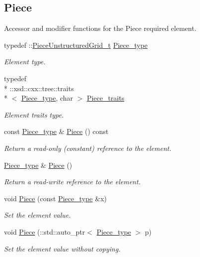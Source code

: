 \subsection*{Piece}
\label{_amgrpa5d512bf83495b68d0ffa20f79804dfc}%
Accessor and modifier functions for the Piece required element. \begin{DoxyCompactItemize}
\item 
typedef \-::\hyperlink{classPieceUnstructuredGrid__t}{Piece\-Unstructured\-Grid\-\_\-t} \hyperlink{classUnstructuredGrid__t_a559913611314b34f4868027fc91e35bc}{Piece\-\_\-type}
\begin{DoxyCompactList}\small\item\em Element type. \end{DoxyCompactList}\item 
typedef \\*
\-::xsd\-::cxx\-::tree\-::traits\\*
$<$ \hyperlink{classUnstructuredGrid__t_a559913611314b34f4868027fc91e35bc}{Piece\-\_\-type}, char $>$ \hyperlink{classUnstructuredGrid__t_a8a9bf012c364a5fbb78aac9a319a4dad}{Piece\-\_\-traits}
\begin{DoxyCompactList}\small\item\em Element traits type. \end{DoxyCompactList}\item 
const \hyperlink{classUnstructuredGrid__t_a559913611314b34f4868027fc91e35bc}{Piece\-\_\-type} \& \hyperlink{classUnstructuredGrid__t_a32fdd47d79cfdd2eb071cf674b7cc9ee}{Piece} () const 
\begin{DoxyCompactList}\small\item\em Return a read-\/only (constant) reference to the element. \end{DoxyCompactList}\item 
\hyperlink{classUnstructuredGrid__t_a559913611314b34f4868027fc91e35bc}{Piece\-\_\-type} \& \hyperlink{classUnstructuredGrid__t_a66b7c6fc204fdc78b4611fd132771573}{Piece} ()
\begin{DoxyCompactList}\small\item\em Return a read-\/write reference to the element. \end{DoxyCompactList}\item 
void \hyperlink{classUnstructuredGrid__t_a97ef3f79738631a4265c4fbeb170f04d}{Piece} (const \hyperlink{classUnstructuredGrid__t_a559913611314b34f4868027fc91e35bc}{Piece\-\_\-type} \&x)
\begin{DoxyCompactList}\small\item\em Set the element value. \end{DoxyCompactList}\item 
void \hyperlink{classUnstructuredGrid__t_aadd93b1b259778a8ef49c3d6e5b0be5d}{Piece} (\-::std\-::auto\-\_\-ptr$<$ \hyperlink{classUnstructuredGrid__t_a559913611314b34f4868027fc91e35bc}{Piece\-\_\-type} $>$ p)
\begin{DoxyCompactList}\small\item\em Set the element value without copying. \end{DoxyCompactList}\end{DoxyCompactItemize}
